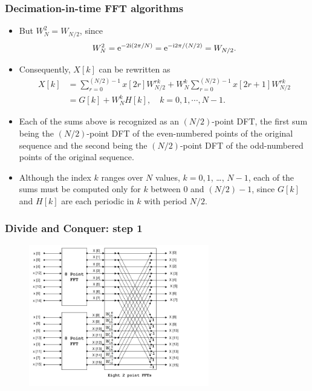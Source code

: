 \begin{frame}
\frametitle{Decimation-in-time FFT algorithms}
\begin{itemize}
\item But $W_{N}^{2}=W_{N/2}$, since
$$
W_{N}^{2}=\mathrm{e}^{-2 \mathrm{i} (2\pi/N)}= \mathrm{e}^{-\mathrm{i} 2\pi/(N/2)}=W_{N/2}.
$$
\item Consequently, $X[k]$ can be rewritten as
\begin{align*}
X[k]&=\sum_{r=0}^{(N/2)-1}x[2r]W_{N/2}^{rk}+W_{N}^{k}\sum_{r=0}^{(N/2)-1}x[2r+1]W_{N/2}^{rk} \\
    &=G[k]+W_{N}^{k}H[k],\quad k=0,1,\cdots,N-1.
\end{align*}
\item Each of the sums above is recognized as an $(N/2)$-point DFT, the first sum being the $(N/2)$-point DFT of the even-numbered points of the original sequence and the second being the $(N/2)$-point DFT of the odd-numbered points of the original sequence.
\item Although the index $k$ ranges over $N$ values, $k=0,1$, \dots, $N-1$, each of the sums must be computed only for $k$ between $0$ and $(N/2)-1$, since $G[k]$ and $H[k]$ are each periodic in $k$ with period $N/2$.
\end{itemize}
\end{frame}

\begin{frame}
\frametitle{Divide and Conquer: step 1}
\begin{figure}
  \centering
  \includegraphics[width=0.7\textwidth]{Fig81.jpg}\\
\end{figure}

\end{frame}

